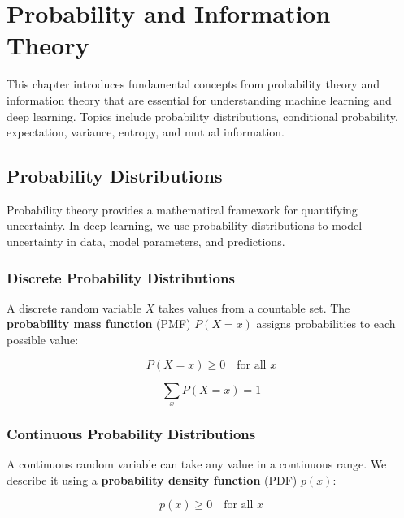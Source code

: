
\chapter{Probability and Information Theory}
\label{chap:probability}

This chapter introduces fundamental concepts from probability theory and information theory that are essential for understanding machine learning and deep learning. Topics include probability distributions, conditional probability, expectation, variance, entropy, and mutual information.

\section{Probability Distributions}
\label{sec:probability-distributions}

Probability theory provides a mathematical framework for quantifying uncertainty. In deep learning, we use probability distributions to model uncertainty in data, model parameters, and predictions.

\subsection{Discrete Probability Distributions}

A discrete random variable $X$ takes values from a countable set. The \textbf{probability mass function} (PMF) $P(X=x)$ assigns probabilities to each possible value:

\begin{equation}
P(X=x) \geq 0 \quad \text{for all } x
\end{equation}

\begin{equation}
\sum_{x} P(X=x) = 1
\end{equation}

\subsection{Continuous Probability Distributions}

A continuous random variable can take any value in a continuous range. We describe it using a \textbf{probability density function} (PDF) $p(x)$:

\begin{equation}
p(x) \geq 0 \quad \text{for all } x
\end{equation}

